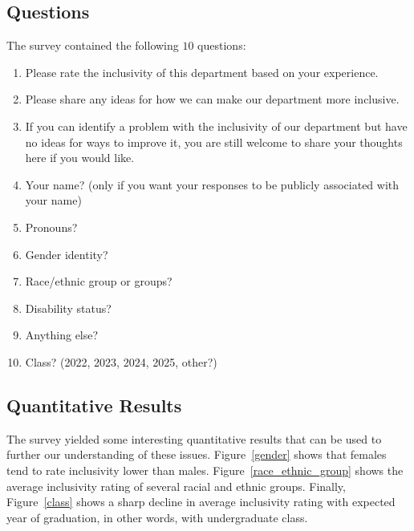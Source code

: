 \documentclass{article}
\begin{document}
\subsection{Questions}
The survey contained the following $10$ questions:
\begin{enumerate}
\item Please rate the inclusivity of this department based on your experience.	
\item Please share any ideas for how we can make our department more inclusive.	
\item If you can identify a problem with the inclusivity of our department but have no ideas for ways to improve it, you are still welcome to share your thoughts here if you would like.	
\item Your name? (only if you want your responses to be publicly associated with your name)	
\item Pronouns?	
\item Gender identity?	
\item Race/ethnic group or groups?	
\item Disability status?	
\item Anything else?	
\item Class? (2022, 2023, 2024, 2025, other?)
\end{enumerate}

\subsection{Quantitative Results}
The survey yielded some interesting quantitative results that can be 
used to further our understanding of these issues.
Figure~\ref{gender} shows that females tend to rate inclusivity lower than males.
Figure~\ref{race_ethnic_group} shows the average inclusivity rating of several racial 
and ethnic groups.
Finally, Figure~\ref{class} shows a sharp decline in average inclusivity rating with 
expected year of graduation, in other words, with undergraduate class.
\end{document}
